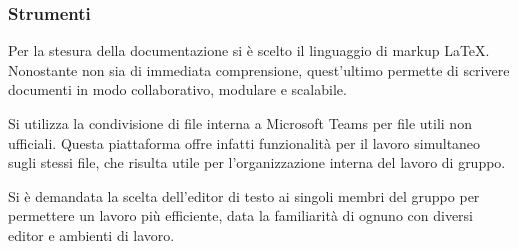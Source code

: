     \subsubsection{Strumenti}
      \subsubsubsection{\LaTeX}
        Per la stesura della documentazione si è scelto il linguaggio di markup \LaTeX{}. Nonostante non sia di immediata comprensione, quest'ultimo permette di scrivere documenti in modo collaborativo, modulare e scalabile.

        Si utilizza la condivisione di file interna a Microsoft Teams per file utili non ufficiali. Questa piattaforma offre infatti funzionalità per il lavoro simultaneo sugli stessi file, che risulta utile per l'organizzazione interna del lavoro di gruppo.

        Si è demandata la scelta dell'editor di testo ai singoli membri del gruppo per permettere un lavoro più efficiente, data la familiarità di ognuno con diversi editor e ambienti di lavoro.

